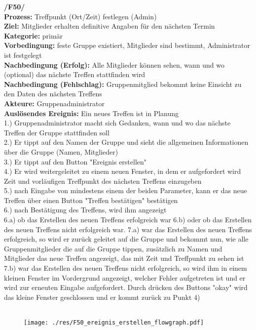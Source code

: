 \textbf{/F50/} \\
\textbf{Prozess:} Treffpunkt (Ort/Zeit) festlegen (Admin)\\
\textbf{Ziel:} Mitglieder erhalten definitive Angaben für den nächsten Termin\\
\textbf{Kategorie:} primär\\
\textbf{Vorbedingung:} feste Gruppe existiert, Mitglieder sind bestimmt, Administrator ist festgelegt\\
\textbf{Nachbedingung (Erfolg):} Alle Mitglieder können sehen, wann und wo (optional) das nächste Treffen stattfinden wird\\
\textbf{Nachbedingung (Fehlschlag):} Gruppenmitglied bekommt keine Einsicht zu den Daten des nächsten Treffens\\
\textbf{Akteure:} Gruppenadministrator\\
\textbf{Auslösendes Ereignis:} Ein neues Treffen ist in Planung\\
1.) Gruppenadministrator macht sich Gedanken, wann und wo das nächste Treffen der Gruppe stattfinden soll\\
2.) Er tippt auf den Namen der Gruppe und sieht die allgemeinen Informationen über die Gruppe (Namen, Mitglieder)\\
3.) Er tippt auf den Button "Ereignis erstellen"\\
4.) Er wird weitergeleitet zu einem neuen Fenster, in dem er aufgefordert wird Zeit und vorläufigen Treffpunkt des nächsten Treffens einzugeben\\
5.) nach Eingabe von mindestens einem der beiden Parameter, kann er das neue Treffen über einen Button "Treffen bestätigen" bestätigen\\
6.) nach Bestätigung des Treffens, wird ihm angezeigt\\
6.a) ob das Erstellen des neuen Treffens erfolgreich war
6.b) oder ob das Erstellen des neuen Treffens nicht erfolgreich war.
7.a) war das Erstellen des neuen Treffens erfolgreich, so wird er zurück geleitet auf die Gruppe und bekommt nun, wie alle Gruppenmitglieder die auf die Gruppe tippen, zusätzlich zu Namen und Mitglieder das neue Treffen angezeigt, das mit Zeit und Treffpunkt zu sehen ist\\
7.b) war das Erstellen des neuen Treffens nicht erfolgreich, so wird ihm in einem kleinen Fenster im Vordergrund angezeigt, welcher Fehler aufgetreten ist und er wird zur erneuten Eingabe aufgefordert. Durch drücken des Buttons "okay" wird das kleine Fenster geschlossen und er kommt zurück zu Punkt 4)\\ \\

\begin{figure} [H]
	\centering
	\texttt{[image: ./res/F50\_ereignis\_erstellen\_flowgraph.pdf]}
\end{figure}

